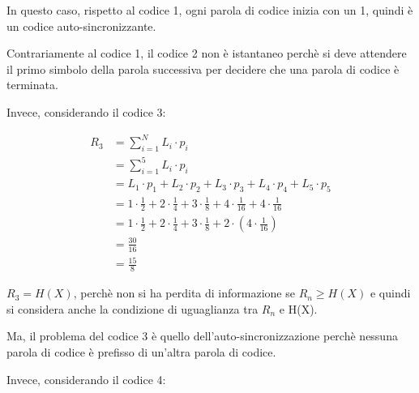 In questo caso, rispetto al codice 1, ogni parola di codice inizia con un 1, quindi è un codice auto-sincronizzante. \newline 

Contrariamente al codice 1, il codice 2 non è istantaneo perchè si deve attendere il primo simbolo della parola successiva per decidere che una parola di codice è terminata. \newline 

Invece, considerando il codice 3: 

{
    \Large 
    \begin{equation}
        \begin{split}
            R_3
            &= 
            \sum_{i = 1}^{N}
            L_i \cdot p_i 
            \\
            &= 
            \sum_{i = 1}^{5}
            L_i \cdot p_i
            \\
            &= 
            L_1 \cdot p_1
            +
            L_2 \cdot p_2
            +
            L_3 \cdot p_3 
            + 
            L_4 \cdot p_4 
            + 
            L_5 \cdot p_5
            \\
            &= 
            1 \cdot \frac{1}{2}
            +
            2 \cdot \frac{1}{4}
            +
            3 \cdot \frac{1}{8} 
            + 
            4 \cdot \frac{1}{16} 
            + 
            4 \cdot \frac{1}{16}
            \\
            &=
            1 \cdot \frac{1}{2}
            +
            2 \cdot \frac{1}{4}
            +
            3 \cdot \frac{1}{8} 
            + 
            2 \cdot
            \left(
                4 \cdot \frac{1}{16}
            \right)
            \\
            &= 
            \frac{30}{16}
            \\
            &= 
            \frac{15}{8}
        \end{split}
    \end{equation}
}

$R_3 = H (X)$, perchè non si ha perdita di informazione se $R_n \ge H(X)$ e quindi si considera anche la condizione di uguaglianza tra $R_n$ e H(X). \newline 

Ma, il problema del codice 3 è quello dell'auto-sincronizzazione perchè nessuna parola di codice è prefisso di un'altra parola di codice. \newline 

Invece, considerando il codice 4: 


